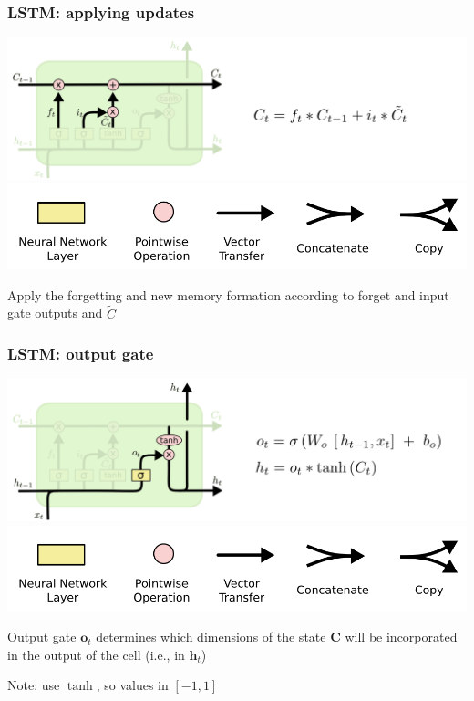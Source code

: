 \documentclass[xcolor=dvipsnames]{beamer}
\begin{document}
\begin{frame}
  \frametitle{LSTM: applying updates}
   \includegraphics[width=.9\textwidth]{olah-lstm/LSTM3-focus-C}\\
\includegraphics[width=.5\textwidth]{olah-lstm/LSTM2-notation}
\bi
\item Apply the forgetting and new memory formation according to
  forget and input gate outputs and $\tilde{C}$
\ei

\end{frame}

\begin{frame}
  \frametitle{LSTM: output gate}
   \includegraphics[width=.9\textwidth]{olah-lstm/LSTM3-focus-o}\\
\includegraphics[width=.5\textwidth]{olah-lstm/LSTM2-notation}
\bi
\item Output gate $\mathbf{o}_t$ determines which dimensions of the
  state $\mathbf{C}$ will be incorporated in the output of the cell
  (i.e., in $\mathbf{h}_t$)
\item Note: use $\tanh$, so values in $[-1,1]$
\ei
\end{frame}
\end{document}
